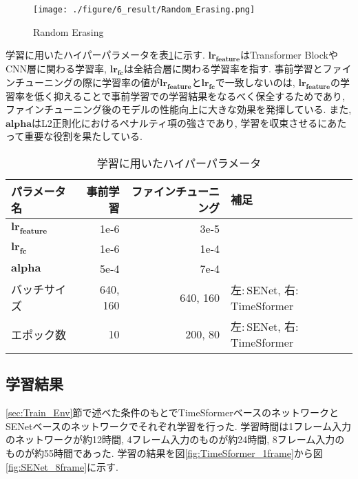 \begin{figure}[thpb]
  \begin{minipage}[htpb]{1.0\hsize}
  \begin{center}
  \texttt{[image: ./figure/6\_result/Random\_Erasing.png]}
  \caption{Random Erasing}
  \label{fig:random_erasing}
  \end{center}
  \end{minipage}
\end{figure}

学習に用いたハイパーパラメータを表\ref{tab:Training_Hyperparameter}に示す. $\bm{lr_{feature}}$はTransformer BlockやCNN層に関わる学習率, $\bm{lr_{fc}}$は全結合層に関わる学習率を指す. 事前学習とファインチューニングの際に学習率の値が$\bm{lr_{feature}}$と$\bm{lr_{fc}}$で一致しないのは, $\bm{lr_{feature}}$の学習率を低く抑えることで事前学習での学習結果をなるべく保全するためであり, ファインチューニング後のモデルの性能向上に大きな効果を発揮している\cite{Fine_Tuning_tips_paper}. また, $\bm{alpha}$はL2正則化\cite{L2_paper}におけるペナルティ項の強さであり, 学習を収束させるにあたって重要な役割を果たしている.

\begin{table}[htbp]
\begin{center}
\caption{学習に用いたハイパーパラメータ}
  \begin{tabular}{l | r r | l}\hline
      パラメータ名 &  事前学習 & ファインチューニング & 補足\\ \hline
    $\bm{lr_{feature}}$ & 1e-6 & 3e-5 & \\
    $\bm{lr_{fc}}$ & 1e-6 & 1e-4 & \\
    $\bm{alpha}$ & 5e-4 & 7e-4 & \\
    バッチサイズ & 640, 160 & 640, 160 & 左$\colon$SENet, 右$\colon$TimeSformer\\
    エポック数 & 10 & 200, 80 & 左$\colon$SENet, 右$\colon$TimeSformer\\ \hline
  \end{tabular}
  \label{tab:Training_Hyperparameter}
\end{center}
\end{table}


\subsection{学習結果}
\ref{sec:Train_Env}節で述べた条件のもとでTimeSformerベースのネットワークとSENetベースのネットワークでそれぞれ学習を行った. 学習時間は1フレーム入力のネットワークが約12時間, 4フレーム入力のものが約24時間, 8フレーム入力のものが約55時間であった. 学習の結果を図\ref{fig:TimeSformer_1frame}から図\ref{fig:SENet_8frame}に示す.

